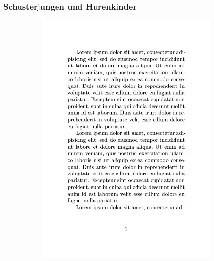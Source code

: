 \documentclass{beamer}
\begin{document}
\begin{frame}[fragile]
    \frametitle{Schusterjungen und Hurenkinder}
    \begin{figure}
        \centering%
        \begin{subfigure}{.35\textwidth}
            \includegraphics[page=1,width=\linewidth]{images/hurenkind/hurenkind.pdf}
        \end{subfigure}%
        \begin{subfigure}{.35\textwidth}

\end{subfigure}
\end{figure}
\end{frame}
\end{document}
